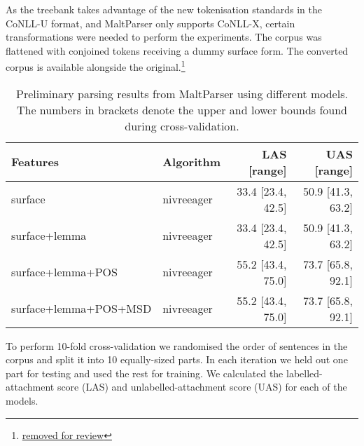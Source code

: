 \documentclass[a4paper,11pt, onecolumn,twoside]{article}
\begin{document}
As the treebank takes advantage of the new tokenisation standards in the CoNLL-U format,
and MaltParser only supports CoNLL-X, certain transformations were needed to perform 
the experiments. The corpus was flattened with conjoined tokens receiving a dummy 
surface form. The converted corpus is available alongside the original.\footnote{\url{removed for review}}






\begin{table}[htbp]
	\caption{Preliminary parsing results from MaltParser using different models. The numbers in brackets denote the upper and lower bounds found during cross-validation.}
	\centering
	\begin{tabular}{llrr}
		\toprule
			\textbf{Features}       & \textbf{Algorithm} &\textbf{LAS} [range] & \textbf{UAS} [range] \\
		\midrule
			surface                & nivreeager  & 33.4 [23.4, 42.5] & 50.9 [41.3, 63.2] \\
			surface+lemma          & nivreeager  & 33.4 [23.4, 42.5] & 50.9 [41.3, 63.2] \\
			surface+lemma+POS      & nivreeager  & 55.2 [43.4, 75.0] & 73.7 [65.8, 92.1] \\
			surface+lemma+POS+MSD  & nivreeager  & 55.2 [43.4, 75.0] & 73.7 [65.8, 92.1] \\
		\bottomrule
	\end{tabular}
	\label{table:eval}
\end{table}

To perform 10-fold cross-validation we randomised the order of sentences in the corpus
and split it into 10 equally-sized parts. In each iteration we held out one part for testing and used
the rest for training. We calculated the labelled-attachment score (LAS) and 
unlabelled-attachment score (UAS) for each of the models.
\end{document}
